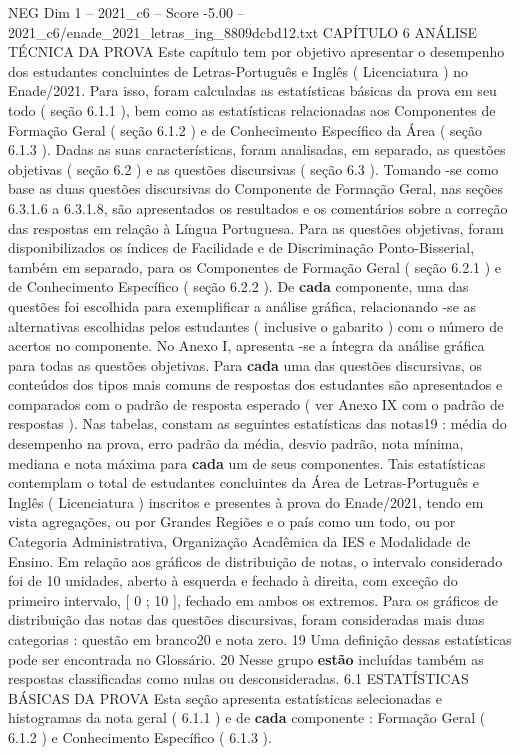 \begin{textsample}{NEG Dim 1 – 2021\_c6 – Score -5.00 – 2021\_c6/enade\_2021\_letras\_ing\_8809dcbd12.txt}  \label{ex:f1_neg_232}
CAPÍTULO 6 ANÁLISE TÉCNICA DA PROVA Este capítulo tem por objetivo apresentar o desempenho dos estudantes concluintes de Letras-Português e Inglês ( Licenciatura ) no Enade/2021.
Para isso, foram calculadas as estatísticas básicas da prova em seu todo ( seção 6.1.1 ), bem como as estatísticas relacionadas aos Componentes de Formação Geral ( seção 6.1.2 ) e de Conhecimento Específico da Área ( seção 6.1.3 ).
Dadas as suas características, foram analisadas, em separado, as questões objetivas ( seção 6.2 ) e as questões discursivas ( seção 6.3 ).
Tomando -se como base as duas questões discursivas do Componente de Formação Geral, nas seções 6.3.1.6 a 6.3.1.8, são apresentados os resultados e os comentários sobre a correção das respostas em relação à Língua Portuguesa.
Para as questões objetivas, foram disponibilizados os índices de Facilidade e de Discriminação Ponto-Bisserial, também em separado, para os Componentes de Formação Geral ( seção 6.2.1 ) e de Conhecimento Específico ( seção 6.2.2 ).
De \textbf{cada} componente, uma das questões foi escolhida para exemplificar a análise gráfica, relacionando -se as alternativas escolhidas pelos estudantes ( inclusive o gabarito ) com o número de acertos no componente.
No Anexo I, apresenta -se a íntegra da análise gráfica para todas as questões objetivas.
Para \textbf{cada} uma das questões discursivas, os conteúdos dos tipos mais comuns de respostas dos estudantes são apresentados e comparados com o padrão de resposta esperado ( ver Anexo IX com o padrão de respostas ).
Nas tabelas, constam as seguintes estatísticas das notas19 : média do desempenho na prova, erro padrão da média, desvio padrão, nota mínima, mediana e nota máxima para \textbf{cada} um de seus componentes.
Tais estatísticas contemplam o total de estudantes concluintes da Área de Letras-Português e Inglês ( Licenciatura ) inscritos e presentes à prova do Enade/2021, tendo em vista agregações, ou por Grandes Regiões e o país como um todo, ou por Categoria Administrativa, Organização Acadêmica da IES e Modalidade de Ensino.
Em relação aos gráficos de distribuição de notas, o intervalo considerado foi de 10 unidades, aberto à esquerda e fechado à direita, com exceção do primeiro intervalo, [ 0 ; 10 ], fechado em ambos os extremos.
Para os gráficos de distribuição das notas das questões discursivas, foram consideradas mais duas categorias : questão em branco20 e nota zero. 19 Uma definição dessas estatísticas pode ser encontrada no Glossário. 20 Nesse grupo \textbf{estão} incluídas também as respostas classificadas como nulas ou desconsideradas. 6.1 ESTATÍSTICAS BÁSICAS DA PROVA Esta seção apresenta estatísticas selecionadas e histogramas da nota geral ( 6.1.1 ) e de \textbf{cada} componente : Formação Geral ( 6.1.2 ) e Conhecimento Específico ( 6.1.3 ).

\end{textsample}
